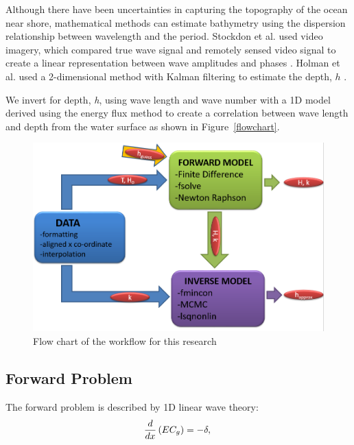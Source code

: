 
Although there have been uncertainties in capturing the topography of the ocean near shore, mathematical methods can estimate bathymetry using the dispersion relationship between wavelength and the period. Stockdon et al. used video imagery, which compared true wave signal and remotely sensed video signal to create a linear representation between wave amplitudes and phases \citep{stockdon2000}.  Holman et al. used a 2-dimensional method with Kalman filtering to estimate the depth, $h$ \citep{holman2013}.

We invert for depth, \textit{h}, using wave length and wave number with a 1D model derived using the energy flux method to create a correlation between wave length and depth from the water surface as shown in Figure~\ref{flowchart}.

\begin{figure}[h]
		\centering
		\includegraphics[width=.6\linewidth]{img/Flow_Chart.png}
		\caption{Flow chart of the workflow for this research}
		\label{AWAC}
\end{figure}

\subsection{Forward Problem}\label{forwardproblem}

The forward problem is described by 1D linear wave theory:
\begin{equation}\label{eqn:model}
\frac{d}{dx}\left(EC_g\right)=-\delta,\\
\end{equation}


